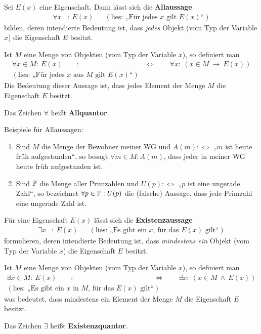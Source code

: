 \begin{defin}[Allaussage] \label{def:allquant}
    Sei $E(x)$ eine Eigenschaft. Dann lässt sich die \textbf{Allaussage}
    \begin{align*}
        \forall x &:\  E(x) && (\text{lies: „Für jedes $x$ gilt $E(x)$“})
    \end{align*}
    bilden, deren intendierte Bedeutung ist, dass \emph{jedes} Objekt (vom Typ der Variable $x$) die Eigenschaft $E$ besitzt.
    
    Ist $M$ eine Menge von Objekten (vom Typ der Variable $x$), so definiert man
    \begin{align*}
        \forall x\in M:\ E(x) \qquad :& \Leftrightarrow\qquad \forall x:\ (x\in M\ \to\ E(x))  \\
        (\text{lies: „Für jedes $x$ aus $M$ gilt $E(x)$“}) &
    \end{align*}
    Die Bedeutung dieser Aussage ist, dass jedes Element der Menge $M$ die Eigenschaft $E$ besitzt.
    
    Das Zeichen $\forall$ heißt \textbf{Allquantor}.
\end{defin}


\begin{bsp}
    Beispiele für Allaussagen:
    \begin{enumerate}
        \item Sind $M$ die Menge der Bewohner meiner WG und $A(m):\Leftrightarrow$ „$m$ ist heute früh aufgestanden“, so besagt $\forall m\in M: A(m)$, dass jeder in meiner WG heute früh aufgestanden ist.
        \item Sind $\mathbb P$ die Menge aller Primzahlen und $U(p):\Leftrightarrow$ „$p$ ist eine ungerade Zahl“, so bezeichnet $\forall p\in\mathbb P : U(p)$ die (falsche) Aussage, dass jede Primzahl eine ungerade Zahl ist.
    \end{enumerate}
\end{bsp}


\begin{defin}[Existenzaussage]\label{def:existquant}
    Für eine Eigenschaft $E(x)$ lässt sich die \textbf{Existenzaussage}
    \begin{align*}
        \exists x &:\ E(x) && (\text{lies: „Es gibt ein $x$, für das $E(x)$ gilt“})
    \end{align*}
    formulieren, deren intendierte Bedeutung ist, dass \emph{mindestens ein} Objekt (vom Typ der Variable $x$) die Eigenschaft $E$ besitzt.
    
    Ist $M$ eine Menge von Objekten (vom Typ der Variable $x$), so definiert man
    \begin{align*}
        \exists x\in M:\ E(x) \qquad :& \Leftrightarrow\qquad \exists x:\ (x\in M\ \land\ E(x))  \\
        (\text{lies: „Es gibt ein $x$ in $M$, für das $E(x)$ gilt“}) &
    \end{align*}
    was bedeutet, dass mindestens ein Element der Menge $M$ die Eigenschaft $E$ besitzt.
    
    Das Zeichen $\exists$ heißt \textbf{Existenzquantor}.
\end{defin}
    

